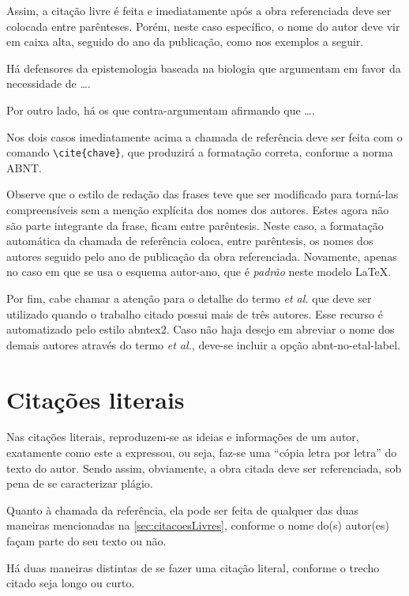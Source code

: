 \begin{apendicesenv}
Assim, a citação livre é feita e imediatamente após a obra referenciada deve ser colocada entre parênteses. Porém, neste caso específico, o nome do autor deve vir em caixa alta, seguido do ano da publicação, como nos exemplos a seguir.

Há defensores da epistemologia baseada na biologia que argumentam em favor da necessidade de \ldots \cite{Maturana2003}.

Por outro lado, há os que contra-argumentam afirmando que \ldots  \cite{Barbosa2004}.

Nos dois casos imediatamente acima a chamada de referência deve ser feita com o comando \verb|\cite{chave}|, que produzirá a formatação correta, conforme a norma ABNT.

Observe que o estilo de redação das frases teve que ser modificado para torná-las compreensíveis sem a menção explícita dos nomes dos autores. Estes agora não são parte integrante da frase, ficam entre parêntesis. Neste caso, a formatação automática da chamada de referência coloca, entre parêntesis, os nomes dos autores seguido pelo ano de publicação da obra referenciada. Novamente, apenas no caso em que se usa o esquema autor-ano, que é \textit{padrão} neste modelo \LaTeX{}.

Por fim, cabe chamar a atenção para o detalhe do termo \textit{et al.} que deve ser utilizado quando o trabalho citado possui mais de três autores. Esse recurso é automatizado pelo estilo {\ttfamily abntex2}. Caso não haja desejo em abreviar o nome dos demais autores através do termo \textit{et al.}, deve-se incluir a opção {\ttfamily abnt-no-etal-label}. 



\section{Citações literais}
\label{sec:citacoesLiterais}

Nas citações literais, reproduzem-se as ideias e informações de um autor, exatamente como este a expressou, ou seja, faz-se uma ``cópia letra por letra'' do texto do autor. Sendo assim, obviamente, a obra citada deve ser referenciada, sob pena de se caracterizar plágio.

Quanto à chamada da referência, ela pode ser feita de qualquer das duas maneiras mencionadas na \autoref{sec:citacoesLivres}, conforme o nome do(s) autor(es) façam parte do seu texto ou não.

Há duas maneiras distintas de se fazer uma citação literal, conforme o trecho citado seja longo ou curto.


\end{apendicesenv}
